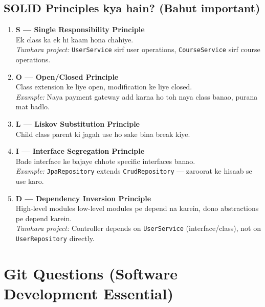 \documentclass[12pt,a4paper]{article}
\begin{document}
\subsection{SOLID Principles kya hain? (Bahut important)}

\begin{answerbox}
\begin{enumerate}
    \item \textbf{S --- Single Responsibility Principle}\\
    Ek class ka ek hi kaam hona chahiye.\\
    \textit{Tumhara project:} \texttt{UserService} sirf user operations, \texttt{CourseService} sirf course operations.

    \item \textbf{O --- Open/Closed Principle}\\
    Class extension ke liye open, modification ke liye closed.\\
    \textit{Example:} Naya payment gateway add karna ho toh naya class banao, purana mat badlo.

    \item \textbf{L --- Liskov Substitution Principle}\\
    Child class parent ki jagah use ho sake bina break kiye.

    \item \textbf{I --- Interface Segregation Principle}\\
    Bade interface ke bajaye chhote specific interfaces banao.\\
    \textit{Example:} \texttt{JpaRepository} extends \texttt{CrudRepository} --- zaroorat ke hisaab se use karo.

    \item \textbf{D --- Dependency Inversion Principle}\\
    High-level modules low-level modules pe depend na karein, dono abstractions pe depend karein.\\
    \textit{Tumhara project:} Controller depends on \texttt{UserService} (interface/class), not on \texttt{UserRepository} directly.
\end{enumerate}
\end{answerbox}

\section{Git Questions (Software Development Essential)}
\end{document}
